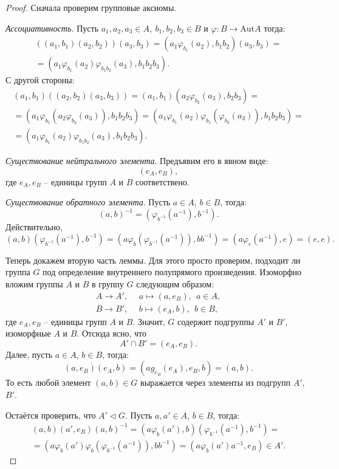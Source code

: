 \documentclass{article}
\begin{document}
\begin{proof}
    Сначала проверим групповые аксиомы.

    \textit{Ассоциативность.} Пусть $a_1, a_2, a_3 \in A, \ b_1, b_2, b_3 \in B $ и $\varphi: B \rightarrow \mathrm{Aut} A$ тогда:
    \begin{multline*}
        ((a_1, b_1) (a_2, b_2)) (a_3, b_3) = (a_1 \varphi_{b_1}(a_2), b_1 b_2) (a_3, b_3) = \\
        = (a_1 \varphi_{b_1}(a_2) \varphi_{b_1 b_2}(a_3), b_1 b_2 b_3).
    \end{multline*}
    С другой стороны:
    \begin{multline*}
        (a_1, b_1) ((a_2, b_2) (a_3, b_3)) = (a_1, b_1) (a_2 \varphi_{b_2}(a_3), b_2 b_3) = \\
        = (a_1 \varphi_{b_1}(a_2 \varphi_{b_2}(a_3)), b_1 b_2 b_3) = (a_1 \varphi_{b_1}(a_2) \varphi_{b_1}(\varphi_{b_2}(a_3)), b_1 b_2 b_3) = \\
        = (a_1 \varphi_{b_1}(a_2) \varphi_{b_1 b_2}(a_3), b_1 b_2 b_3).
    \end{multline*}

    \textit{Существование нейтрального элемента}. Предъявим его в явном виде: $$ (e_A, e_B), $$ где $e_A, e_B$ -- единицы групп $A$ и $B$ соответствено.

    \textit{Существование обратного элемента}. Пусть $a \in A$, $b \in B$, тогда: $$ (a, b)^{-1} = (\varphi_{b^{-1}}(a^{-1}), b^{-1}). $$ Действительно,
    \[
        (a, b) (\varphi_{b^{-1}}(a^{-1}), b^{-1}) = (a \varphi_b(\varphi_{b^{-1}}(a^{-1})), b b^{-1}) = (a \varphi_e(a^{-1}), e) = (e, e).
    \]

    Теперь докажем вторую часть леммы. Для этого просто проверим, подходит ли группа $G$ под определение внутреннего полупрямого произведения.
    Изоморфно вложим группы $A$ и $B$ в группу $G$ следующим образом:
    \begin{align*}
        A \rightarrow A', & \ \ a \mapsto (a, e_B), \ \ a \in A, \\
        B \rightarrow B', & \ \ b \mapsto (e_A, b), \ \ b \in B,
    \end{align*}
    где $e_A, e_B$ -- единицы групп $A$ и $B$. Значит, $G$ содержит подгруппы $A'$ и $B'$, изоморфные $A$ и $B$. Отсюда ясно, что $$ A' \cap B' = (e_A, e_B).$$
    Далее, пусть $a \in A$, $b \in B$, тогда: $$ (a, e_B) (e_A, b) = (a g_{e_B}(e_A), e_B, b) = (a,b). $$
    То есть любой элемент $(a, b) \in G$ выражается через элементы из подгрупп $A'$, $B'$.

    Остаётся проверить, что $A' \triangleleft G$. Пусть $a, a' \in A$, $b \in B$, тогда:
    \begin{multline*}
        (a, b) (a', e_B) (a, b)^{-1} = (a \varphi_b(a'), b) (\varphi_{b^{-1}}(a^{-1}), b^{-1}) = \\
        = (a \varphi_b(a')\varphi_b(\varphi_{b^{-1}}(a^{-1})), b b^{-1}) = (a \varphi_b(a') a^{-1}, e_B) \in A'.
    \end{multline*}
\end{proof}
\end{document}
